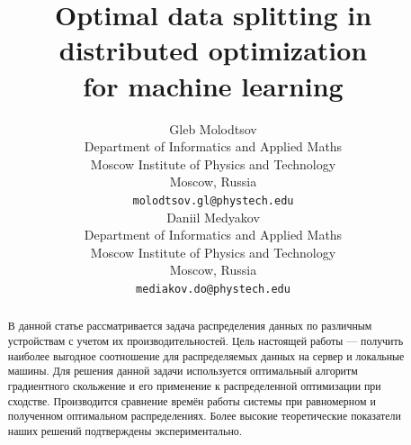 \documentclass{article}
\title{Optimal data splitting in distributed optimization \\for machine learning}
\author{Gleb Molodtsov
    \\
	Department of Informatics and Applied Maths \\
	Moscow Institute of Physics and Technology\\
	Moscow, Russia\\
	\texttt{molodtsov.gl@phystech.edu} \\
	\And
	Daniil Medyakov \\
	Department of Informatics and Applied Maths \\
	Moscow Institute of Physics and Technology\\
	Moscow, Russia \\
	\texttt{mediakov.do@phystech.edu} \\
}
\begin{document}
\maketitle




\begin{abstract}
В данной статье рассматривается задача  распределения данных по различным устройствам с учетом их производительностей. Цель настоящей работы --- получить наиболее выгодное соотношение для распределяемых данных на сервер и локальные машины. Для решения данной задачи используется оптимальный алгоритм градиентного скольжение и его применение к распределенной оптимизации при сходстве. Производится сравнение времён работы системы при равномерном и полученном оптимальном распределениях. Более высокие теоретические показатели наших решений подтверждены экспериментально.
\end{abstract}
\end{document}
